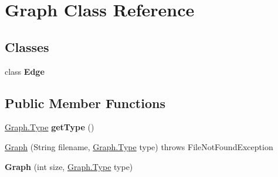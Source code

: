 \hypertarget{classGraph}{
\section{Graph Class Reference}
\label{classGraph}
}
\subsection*{Classes}
\begin{DoxyCompactItemize}
\item 
class {\bfseries Edge}
\end{DoxyCompactItemize}
\subsection*{Public Member Functions}
\begin{DoxyCompactItemize}
\item 
\hypertarget{classGraph_ada3f3f1186255e18b8467b8044a0a45f}{
\hyperlink{classGraph_aa4b8785265efefb668f2931c8f18c8e0}{Graph.Type} {\bfseries getType} ()}
\label{classGraph_ada3f3f1186255e18b8467b8044a0a45f}

\item 
\hyperlink{classGraph_ad807b85e0af693b12607a8f66bdd6f2d}{Graph} (String filename, \hyperlink{classGraph_aa4b8785265efefb668f2931c8f18c8e0}{Graph.Type} type)  throws FileNotFoundException 
\item 
\hypertarget{classGraph_ae06670e180d9bd67674227b1f2a3b8d6}{
{\bfseries Graph} (int size, \hyperlink{classGraph_aa4b8785265efefb668f2931c8f18c8e0}{Graph.Type} type)}
\label{classGraph_ae06670e180d9bd67674227b1f2a3b8d6}


\end{DoxyCompactItemize}
